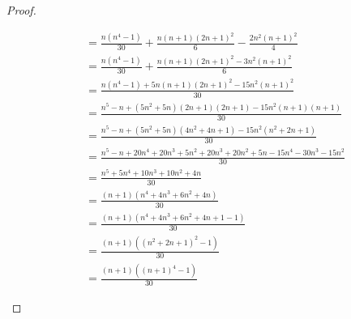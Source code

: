 \documentclass{../problemset}
\begin{document}
\begin{problem}[Summenformeln]
\begin{proof}
\begin{enumerate}
\begin{align}
			                                        & = \frac{n(n^4 - 1)}{30} + \frac{n(n+1)(2n+1)^2}{6} - \frac{2n^2(n+1)^2}{4}                                \\
			                                        & = \frac{n(n^4 - 1)}{30} + \frac{n(n+1)(2n+1)^2 - 3n^2(n+1)^2}{6}                                          \\
			                                        & = \frac{n(n^4 - 1) + 5n(n+1)(2n+1)^2 - 15n^2(n+1)^2}{30}                                                  \\
			                                        & = \frac{n^5 - n + (5n^2+5n)(2n+1)(2n+1) - 15n^2(n+1)(n+1)}{30}                                            \\
			                                        & = \frac{n^5 - n + (5n^2+5n)(4n^2 + 4n +1) - 15n^2(n^2 + 2n +1)}{30}                                       \\
			                                        & = \frac{n^5 - n + 20n^4 + 20n^3 + 5n^2 + 20n^3 + 20n^2 + 5n - 15n^4- 30n^3 - 15n^2}{30}                   \\
			                                        & = \frac{n^5 + 5n^4 + 10n^3 + 10n^2 + 4n}{30}                                                              \\
			                                        & = \frac{(n+1)(n^4+4n^3+6n^2+4n)}{30} \tag{Polynomdivision}                                                \\
			                                        & = \frac{(n+1)(n^4+4n^3+6n^2+4n + 1 - 1)}{30}                                                              \\
			                                        & = \frac{(n+1)((n^2 + 2n +1)^2 - 1)}{30}                                                                   \\
			                                        & = \frac{(n+1)((n + 1)^4 - 1)}{30}
		      \end{align}
	\end{enumerate}
\end{proof}

\end{problem}

\pagebreak
\end{document}
